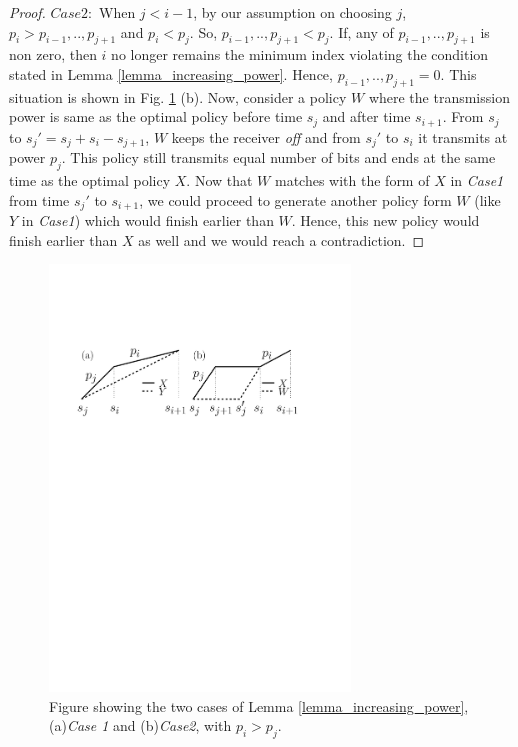 \begin{proof}
$Case 2:$ When $j<i-1$, by our assumption on choosing $j$, $p_i>p_{i-1},..,p_{j+1}$ and $p_i<p_{j}$. So, $p_{i-1},..,p_{j+1}<p_j$. If, any of $p_{i-1},..,p_{j+1}$ is non zero, then $i$ no longer remains the minimum index violating the condition stated in Lemma \ref{lemma_increasing_power}. Hence, $p_{i-1},..,p_{j+1}=0$. This situation is shown in Fig. \ref{Lemma1} (b). Now, consider a policy $W$ where the transmission power is same as the optimal policy before time $s_j$ and after time $s_{i+1}$. From $s_j$ to $s_j'=s_j+s_{i}-s_{j+1}$, $W$ keeps the receiver \textit{off} and from $s_j'$ to $s_{i}$ it transmits at power $p_j$. This policy still transmits equal number of bits and ends at the same time as the optimal policy $X$. Now that $W$ matches with the form of $X$ in \textit{Case1} from time $s_j'$ to $s_{i+1}$, we could proceed to generate another policy form $W$ (like $Y$ in \textit{Case1}) which would finish earlier than $W$. Hence, this new policy would finish earlier than $X$ as well and we would reach a contradiction. 
\end{proof}

\begin{figure}[htb]
  \centering
  \centerline{\includegraphics[width=8cm]{Lemma1.pdf}}
\caption{Figure showing the two cases of Lemma \ref{lemma_increasing_power}, (a)\textit{Case 1}   and (b)\textit{Case2}, with $p_i>p_j$.}\label{Lemma1}
\end{figure}

